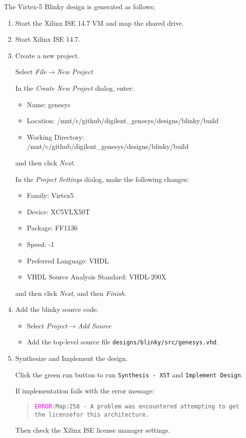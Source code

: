 The Virtex-5 Blinky design is generated as follows;
%
\begin{enumerate}
\item Start the Xilinx ISE 14.7 VM and map the shared drive.
\item Start Xilinx ISE 14.7.
\item Create a new project.

Select \emph{File$\rightarrow$New Project}

In the \emph{Create New Project} dialog, enter:
%
\begin{itemize}
\item Name: genesys
\item Location: /mnt/c/github/digilent\_genesys/designs/blinky/build
\item Working Directory: /mnt/c/github/digilent\_genesys/designs/blinky/build
\end{itemize}
%
and then click \emph{Next}.

In the \emph{Project Settings} dialog, make the following changes:
%
\begin{itemize}
\item Family: Virtex5
\item Device: XC5VLX50T
\item Package: FF1136
\item Speed: -1
\item Preferred Language: VHDL
\item VHDL Source Analysis Standard: VHDL-200X
\end{itemize}
%
and then click \emph{Next}, and then \emph{Finish}.

\item Add the blinky source code.
\begin{itemize}
\item Select \emph{Project$\rightarrow$Add Source}
\item Add the top-level source file \verb+designs/blinky/src/genesys.vhd+. 
\end{itemize}

\item Synthesize and Implement the design.

Click the green run button to run \verb+Synthesis - XST+ and \verb+Implement Design+.

If implementation fails with the error message:
%
\begin{quote}
\texttt{\textcolor{magenta}{ERROR}:Map:258 - A problem was encountered 
attempting to get the license\newline for this architecture.}
\end{quote}
%
Then check the Xilinx ISE license manager settings.

\end{enumerate}



